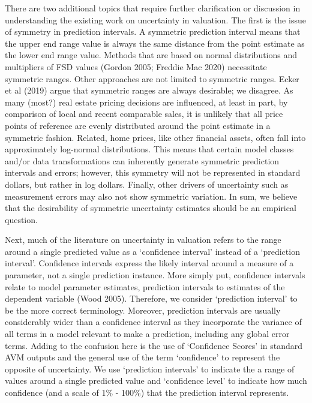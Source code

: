 \documentclass[colTwo]{format}
\theoremstyle{definition}
\begin{document}
There are two additional topics that require further clarification or discussion in understanding the existing work on uncertainty in valuation. The first is the issue of symmetry in prediction intervals.  A symmetric prediction interval means that the upper end range value is always the same distance from the point estimate as the lower end range value.  Methods that are based on normal distributions and multipliers of FSD values (Gordon 2005; Freddie Mac 2020) necessitate symmetric ranges. Other approaches are not limited to symmetric ranges.  Ecker et al (2019) argue that symmetric ranges are always desirable; we disagree.  As many (most?) real estate pricing decisions are influenced, at least in part, by comparison of local and recent comparable sales, it is unlikely that all price points of reference are evenly distributed around the point estimate in a symmetric fashion.  Related, home prices, like other financial assets, often fall into approximately log-normal distributions.  This means that certain model classes and/or data transformations can inherently generate symmetric prediction intervals and errors; however, this symmetry will not be represented in standard dollars, but rather in log dollars. Finally, other drivers of uncertainty such as measurement errors may also not show symmetric variation.  In sum, we believe that the desirability of symmetric uncertainty estimates should be an empirical question.  

Next, much of the literature on uncertainty in valuation refers to the range around a single predicted value as a ‘confidence interval’ instead of a ‘prediction interval’.  Confidence intervals express the likely interval around a measure of a  parameter, not a single prediction instance.  More simply put, confidence intervals relate to model parameter estimates, prediction intervals to estimates of the dependent variable (Wood 2005).  Therefore, we consider ‘prediction interval’ to be the more correct terminology.  Moreover, prediction intervals are usually considerably wider than a confidence interval as they incorporate the variance of all terms in a model relevant to make a prediction, including any global error terms. Adding to the confusion here is the use of ‘Confidence Scores’ in standard AVM outputs and the general use of the term ‘confidence’ to represent the opposite of uncertainty. We use ‘prediction intervals’ to indicate the a range of values around a single predicted value and ‘confidence level’ to indicate how much confidence (and a scale of 1\% - 100\%) that the prediction interval represents.
\end{document}
